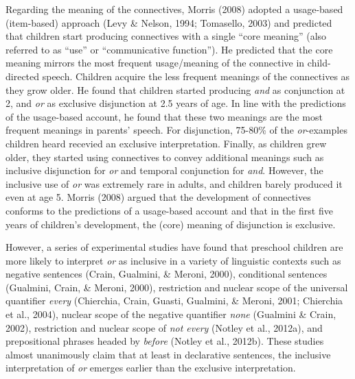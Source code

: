\documentclass[,man,floatsintext]{apa6}
\begin{document}
Regarding the meaning of the connectives, Morris (2008) adopted a usage-based (item-based) approach (Levy \& Nelson, 1994; Tomasello, 2003) and predicted that children start producing connectives with a single \enquote{core meaning} (also referred to as \enquote{use} or \enquote{communicative function}). He predicted that the core meaning mirrors the most frequent usage/meaning of the connective in child-directed speech. Children acquire the less frequent meanings of the connectives as they grow older. He found that children started producing \emph{and} as conjunction at 2, and \emph{or} as exclusive disjunction at 2.5 years of age. In line with the predictions of the usage-based account, he found that these two meanings are the most frequent meanings in parents' speech. For disjunction, 75-80\% of the \emph{or}-examples children heard recevied an exclusive interpretation. Finally, as children grew older, they started using connectives to convey additional meanings such as inclusive disjunction for \emph{or} and temporal conjunction for \emph{and}. However, the inclusive use of \emph{or} was extremely rare in adults, and children barely produced it even at age 5. Morris (2008) argued that the development of connectives conforms to the predictions of a usage-based account and that in the first five years of children's development, the (core) meaning of disjunction is exclusive.

However, a series of experimental studies have found that preschool children are more likely to interpret \emph{or} as inclusive in a variety of linguistic contexts such as negative sentences (Crain, Gualmini, \& Meroni, 2000), conditional sentences (Gualmini, Crain, \& Meroni, 2000), restriction and nuclear scope of the universal quantifier \emph{every} (Chierchia, Crain, Guasti, Gualmini, \& Meroni, 2001; Chierchia et al., 2004), nuclear scope of the negative quantifier \emph{none} (Gualmini \& Crain, 2002), restriction and nuclear scope of \emph{not every} (Notley et al., 2012a), and prepositional phrases headed by \emph{before} (Notley et al., 2012b). These studies almost unanimously claim that at least in declarative sentences, the inclusive interpretation of \emph{or} emerges earlier than the exclusive interpretation.
\end{document}
